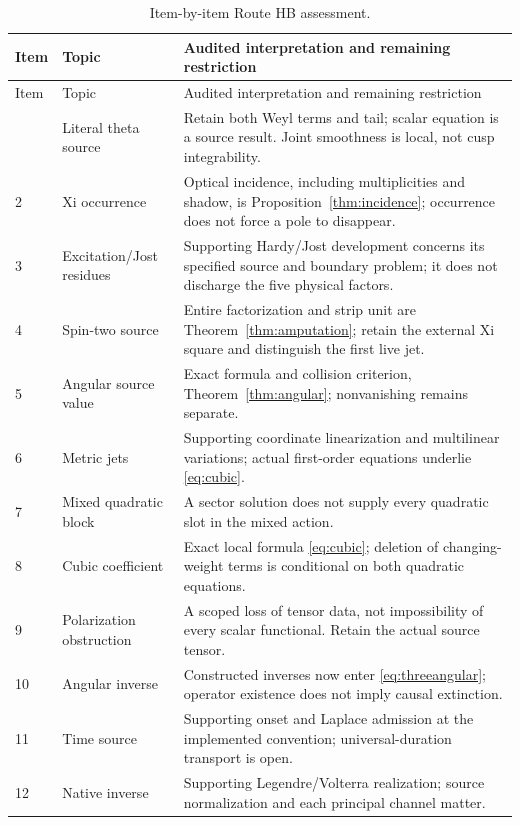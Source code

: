 \small
\begin{longtable}{@{}p{.07\linewidth}p{.28\linewidth}p{.59\linewidth}@{}}
\caption{Item-by-item Route HB assessment.}\label{tab:ledger}\\
\toprule Item & Topic & Audited interpretation and remaining restriction\\\midrule
\endfirsthead
\toprule Item & Topic & Audited interpretation and remaining restriction\\\midrule
\endhead
\bottomrule\endfoot
1 & Literal theta source & Retain both Weyl terms and tail; scalar equation is a source result. Joint smoothness is local, not cusp integrability.\\
2 & Xi occurrence & Optical incidence, including multiplicities and shadow, is Proposition~\ref{thm:incidence}; occurrence does not force a pole to disappear.\\
3 & Excitation/Jost residues & Supporting Hardy/Jost development concerns its specified source and boundary problem; it does not discharge the five physical factors.\\
4 & Spin-two source & Entire factorization and strip unit are Theorem~\ref{thm:amputation}; retain the external Xi square and distinguish the first live jet.\\
5 & Angular source value & Exact formula and collision criterion, Theorem~\ref{thm:angular}; nonvanishing remains separate.\\
6 & Metric jets & Supporting coordinate linearization and multilinear variations; actual first-order equations underlie \eqref{eq:cubic}.\\
7 & Mixed quadratic block & A sector solution does not supply every quadratic slot in the mixed action.\\
8 & Cubic coefficient & Exact local formula \eqref{eq:cubic}; deletion of changing-weight terms is conditional on both quadratic equations.\\
9 & Polarization obstruction & A scoped loss of tensor data, not impossibility of every scalar functional. Retain the actual source tensor.\\
10 & Angular inverse & Constructed inverses now enter \eqref{eq:threeangular}; operator existence does not imply causal extinction.\\
11 & Time source & Supporting onset and Laplace admission at the implemented convention; universal-duration transport is open.\\
12 & Native inverse & Supporting Legendre/Volterra realization; source normalization and each principal channel matter.\\

\end{longtable}
